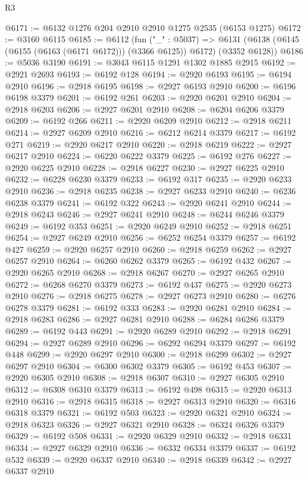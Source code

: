 \begin{lexlean}{R3}
\begin{coremodule}
@6171 := @6132 @1276 @204 @2910 @2910 @1275 @2535 (@6153 @1275)
@6172 := @3160 @6115
@6185 := @6112
    (fun ("_" : @5037) =>
    @6131 (@6138 (@6145 (@6155 (@6163 (@6171 @6172))) (@3366 @6125)) @6172) (@3352 @6128))
@6186 := @5036 @3190
@6191 := @3043 @6115 @1291 @1302 @1885 @2915
@6192 := @2921 @2693
@6193 := @6192 @128
@6194 := @2920 @6193
@6195 := @6194 @2910
@6196 := @2918 @6195
@6198 := @2927 @6193 @2910
@6200 := @6196 @6198 @3379
@6201 := @6192 @261
@6203 := @2920 @6201 @2910
@6204 := @2918 @6203
@6206 := @2927 @6201 @2910
@6208 := @6204 @6206 @3379
@6209 := @6192 @266
@6211 := @2920 @6209 @2910
@6212 := @2918 @6211
@6214 := @2927 @6209 @2910
@6216 := @6212 @6214 @3379
@6217 := @6192 @271
@6219 := @2920 @6217 @2910
@6220 := @2918 @6219
@6222 := @2927 @6217 @2910
@6224 := @6220 @6222 @3379
@6225 := @6192 @276
@6227 := @2920 @6225 @2910
@6228 := @2918 @6227
@6230 := @2927 @6225 @2910
@6232 := @6228 @6230 @3379
@6233 := @6192 @317
@6235 := @2920 @6233 @2910
@6236 := @2918 @6235
@6238 := @2927 @6233 @2910
@6240 := @6236 @6238 @3379
@6241 := @6192 @322
@6243 := @2920 @6241 @2910
@6244 := @2918 @6243
@6246 := @2927 @6241 @2910
@6248 := @6244 @6246 @3379
@6249 := @6192 @353
@6251 := @2920 @6249 @2910
@6252 := @2918 @6251
@6254 := @2927 @6249 @2910
@6256 := @6252 @6254 @3379
@6257 := @6192 @427
@6259 := @2920 @6257 @2910
@6260 := @2918 @6259
@6262 := @2927 @6257 @2910
@6264 := @6260 @6262 @3379
@6265 := @6192 @432
@6267 := @2920 @6265 @2910
@6268 := @2918 @6267
@6270 := @2927 @6265 @2910
@6272 := @6268 @6270 @3379
@6273 := @6192 @437
@6275 := @2920 @6273 @2910
@6276 := @2918 @6275
@6278 := @2927 @6273 @2910
@6280 := @6276 @6278 @3379
@6281 := @6192 @333
@6283 := @2920 @6281 @2910
@6284 := @2918 @6283
@6286 := @2927 @6281 @2910
@6288 := @6284 @6286 @3379
@6289 := @6192 @443
@6291 := @2920 @6289 @2910
@6292 := @2918 @6291
@6294 := @2927 @6289 @2910
@6296 := @6292 @6294 @3379
@6297 := @6192 @448
@6299 := @2920 @6297 @2910
@6300 := @2918 @6299
@6302 := @2927 @6297 @2910
@6304 := @6300 @6302 @3379
@6305 := @6192 @453
@6307 := @2920 @6305 @2910
@6308 := @2918 @6307
@6310 := @2927 @6305 @2910
@6312 := @6308 @6310 @3379
@6313 := @6192 @498
@6315 := @2920 @6313 @2910
@6316 := @2918 @6315
@6318 := @2927 @6313 @2910
@6320 := @6316 @6318 @3379
@6321 := @6192 @503
@6323 := @2920 @6321 @2910
@6324 := @2918 @6323
@6326 := @2927 @6321 @2910
@6328 := @6324 @6326 @3379
@6329 := @6192 @508
@6331 := @2920 @6329 @2910
@6332 := @2918 @6331
@6334 := @2927 @6329 @2910
@6336 := @6332 @6334 @3379
@6337 := @6192 @532
@6339 := @2920 @6337 @2910
@6340 := @2918 @6339
@6342 := @2927 @6337 @2910

\end{coremodule}
\end{lexlean}
